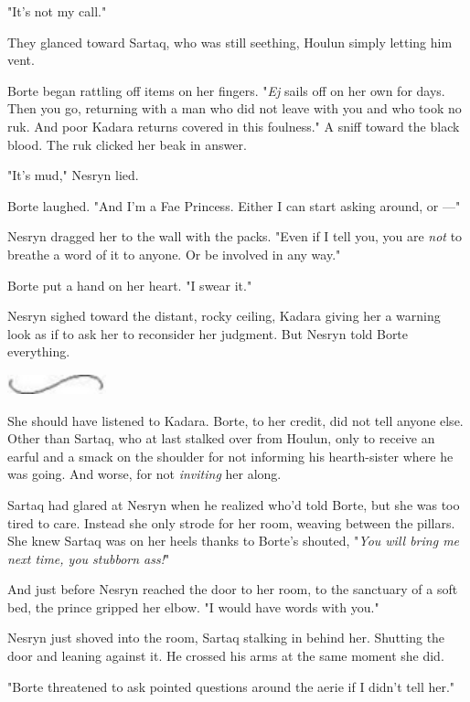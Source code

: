"It's not my call."

They glanced toward Sartaq, who was still seething, Houlun simply letting him vent.

Borte began rattling off items on her fingers.
"\emph{Ej} sails off on her own for days.
Then you go, returning with a man who did not leave with you and who took no ruk.
And poor Kadara returns covered in this  foulness."
A sniff toward the black blood.
The ruk clicked her beak in answer.

"It's mud," Nesryn lied.

Borte laughed.
"And I'm a Fae Princess.
Either I can start asking around, or ---"

Nesryn dragged her to the wall with the packs.
"Even if I tell you, you are \emph{not} to breathe a word of it to anyone.
Or be involved in any way."

Borte put a hand on her heart.
"I swear it."

Nesryn sighed toward the distant, rocky ceiling, Kadara giving her a warning look as if to ask her to reconsider her judgment.
But Nesryn told Borte everything.

\begin{center}
	\includegraphics[width=1.12in,height=0.24in]{images/seperator}
\end{center}

She should have listened to Kadara.
Borte, to her credit, did not tell anyone else.
Other than Sartaq, who at last stalked over from Houlun, only to receive an earful and a smack on the shoulder for not informing his hearth-sister where he was going.
And worse, for not \emph{inviting}
her along.

Sartaq had glared at Nesryn when he realized who'd told Borte, but she was too tired to care.
Instead she only strode for her room, weaving between the pillars.
She knew Sartaq was on her heels thanks to Borte's shouted, "\emph{You will bring me next time, you stubborn ass!}"

And just before Nesryn reached the door to her room, to the sanctuary of a soft bed, the prince gripped her elbow.
"I would have words with you."

Nesryn just shoved into the room, Sartaq stalking in behind her.
Shutting the door and leaning against it.
He crossed his arms at the same moment she did.

"Borte threatened to ask pointed questions around the aerie if I didn't tell her."

